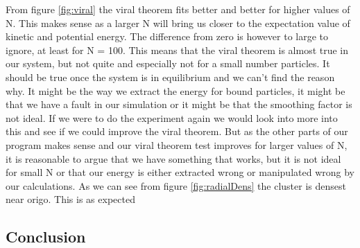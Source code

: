 \documentclass{article}
\begin{document}
From figure \ref{fig:viral} the viral theorem fits better and better for higher values of N. This makes sense as a larger N will bring us closer to the expectation value of kinetic and potential energy. The difference from zero is however to large to ignore, at least for N = 100. This means that the viral theorem is almost true in our system, but not quite and especially not for a small number particles. It should be true once the system is in equilibrium and we can't find the reason why. It might be the way we extract the energy for bound particles, it might be that we have a fault in our simulation or it might be that the smoothing factor is not ideal. If we were to do the experiment again we would look into more into this and see if we could improve the viral theorem. But as the other parts of our program makes sense and our viral theorem test improves for larger values of N, it is reasonable to argue that we have something that works, but it is not ideal for small N or that our energy is either extracted wrong or manipulated wrong by our calculations.
As we can see from figure \ref{fig:radialDens} the cluster is densest near origo. This is as expected 

\subsection{Conclusion}

\end{document}
